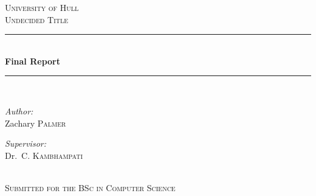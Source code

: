 \begin{titlepage}

\newcommand{\HRule}{\rule{\linewidth}{0.5mm}} %

\center{} %
 

\textsc{\LARGE University of Hull}\\[1.5cm] %
\textsc{\Large Undecided Title}\\[0.5cm] %


\HRule\\[0.4cm]
{\huge \bfseries Final Report}\\[0.4cm] %
\HRule\\[1.5cm]
 

\begin{minipage}{0.4\textwidth}
\begin{flushleft} \large
\emph{Author:}\\
Zachary \textsc{Palmer} %
\end{flushleft}
\end{minipage}
\begin{minipage}{0.4\textwidth}
\begin{flushright} \large
\emph{Supervisor:} \\
Dr.\ C. \textsc{Kambhampati} %
\end{flushright}
\end{minipage}\\[2cm]

\textsc{\large Submitted for the BSc in Computer Science}\\[0.5cm]


\end{titlepage}

